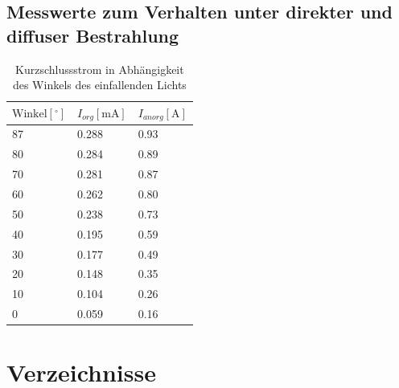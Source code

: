 \documentclass[slug=SZ, room=Hermann-Krone-Bau\,\ Labor\ 1.25,
supervisor=Martin\ Kroll, coursedate=14.\ 11.\ 2019]{../../Lab_Report_LaTeX/lab_report}
\begin{document}
\subsection{Messwerte zum Verhalten unter direkter und diffuser Bestrahlung}

\begin{table}[H]
        \centering
        \begin{tabular}{l|l|l}
                \toprule
                \(\text{Winkel} [^\circ]\) & \(I_{org} [\si{\milli\ampere}]\) &\(I_{anorg} [\si{\ampere}]\) \\
                \midrule
                87 & 0.288 & 0.93 \\
                80 & 0.284 & 0.89 \\
                70 & 0.281 & 0.87 \\
                60 & 0.262 & 0.80 \\
                50 & 0.238 & 0.73 \\
                40 & 0.195 & 0.59 \\
                30 & 0.177 & 0.49 \\
                20 & 0.148 & 0.35 \\
                10 & 0.104 & 0.26 \\
                0 & 0.059 & 0.16 \\
        \end{tabular}
        \caption{Kurzschlussstrom in Abhängigkeit des Winkels des einfallenden Lichts}
        \label{tab:messe}
\end{table}

\section{Verzeichnisse}

\label{sec:literatur}

\listoffigures

\listoftables

\printbibliography
\end{document}
